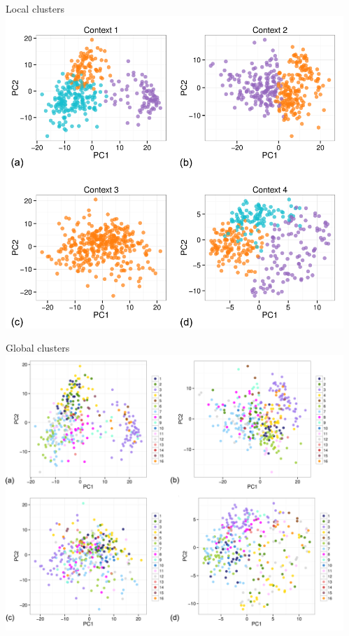 \documentclass[t, final]{beamer}
\begin{document}
\begin{frame}{}
\begin{columns}[t]
\begin{column}{.32\linewidth}
\end{column}


\begin{column}{.32\linewidth}

\begin{block}{Local clusters}
  \includegraphics[width=\textwidth]{Figures/breast-PCA-local}
\end{block}

\begin{block}{Global clusters}
  \includegraphics[width=\textwidth]{Figures/breast-PCA}
\end{block}


\end{column}
\end{columns}
\end{frame}
\end{document}
